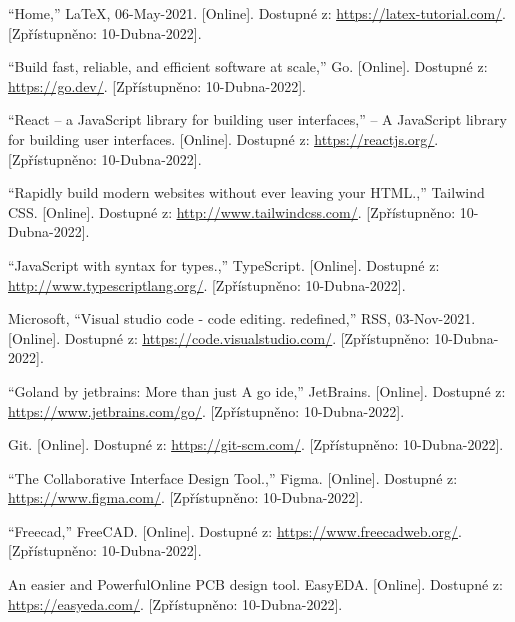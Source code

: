 \documentclass[czech,12pt,a4paper]{article}
\begin{document}
\begin{thebibliography}{9}
	\vspace*{-1.5cm}
	“Home,” LaTeX, 06-May-2021. [Online]. Dostupné z: \underline{\href{https://latex-tutorial.com/}{https://latex-tutorial.com/}}. [Zpřístupněno: 10-Dubna-2022]. 

	“Build fast, reliable, and efficient software at scale,” Go. [Online]. Dostupné z: \underline{\href{https://go.dev/}{https://go.dev/}}. [Zpřístupněno: 10-Dubna-2022]. 

	“React – a JavaScript library for building user interfaces,” – A JavaScript library for building user interfaces. [Online]. Dostupné z: \underline{\href{https://reactjs.org/}{https://reactjs.org/}}. [Zpřístupněno: 10-Dubna-2022]. 

	“Rapidly build modern websites without ever leaving your HTML.,” Tailwind CSS. [Online]. Dostupné z: \underline{\href{http://www.tailwindcss.com/}{http://www.tailwindcss.com/}}. [Zpřístupněno: 10-Dubna-2022]. 

	“JavaScript with syntax for types.,” TypeScript. [Online]. Dostupné z: \underline{\href{http://www.typescriptlang.org/}{http://www.typescriptlang.org/}}. [Zpřístupněno: 10-Dubna-2022]. 

	Microsoft, “Visual studio code - code editing. redefined,” RSS, 03-Nov-2021. [Online]. Dostupné z: \underline{\href{https://code.visualstudio.com/}{https://code.visualstudio.com/}}. [Zpřístupněno: 10-Dubna-2022]. 

	“Goland by jetbrains: More than just A go ide,” JetBrains. [Online]. Dostupné z: \underline{\href{https://www.jetbrains.com/go/}{https://www.jetbrains.com/go/}}. [Zpřístupněno: 10-Dubna-2022]. 

	Git. [Online]. Dostupné z: \underline{\href{https://git-scm.com/}{https://git-scm.com/}}. [Zpřístupněno: 10-Dubna-2022]. 

	“The Collaborative Interface Design Tool.,” Figma. [Online]. Dostupné z: \underline{\href{https://www.figma.com/}{https://www.figma.com/}}. [Zpřístupněno: 10-Dubna-2022]. 

	“Freecad,” FreeCAD. [Online]. Dostupné z: \underline{\href{https://www.freecadweb.org/}{https://www.freecadweb.org/}}. [Zpřístupněno: 10-Dubna-2022]. 

	An easier and PowerfulOnline PCB design tool. EasyEDA. [Online]. Dostupné z: \underline{\href{https://easyeda.com/}{https://easyeda.com/}}. [Zpřístupněno: 10-Dubna-2022]. 
\end{thebibliography}
\end{document}
